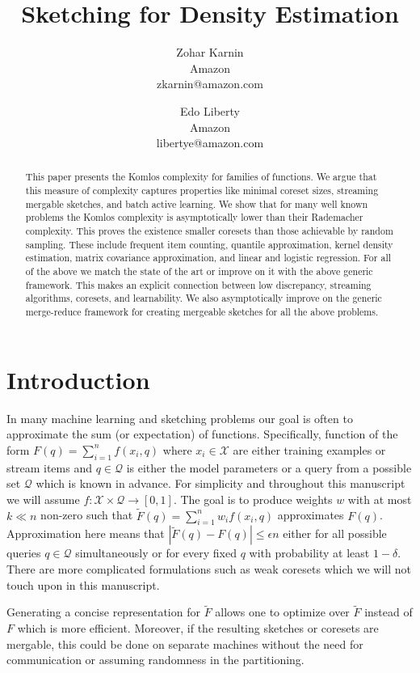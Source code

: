 \documentclass{article} %
\title{Sketching for Density Estimation}
\date{\nonumber}
\author{
Zohar Karnin\\Amazon\\zkarnin@amazon.com
\and
Edo Liberty\\Amazon\\libertye@amazon.com
}
\newcommand{\eps}{\epsilon}
\newcommand{\X}{\mathcal{X}}
\newcommand{\Q}{\mathcal{Q}}
\begin{document}
\maketitle

\begin{abstract}
This paper presents the Komlos complexity for families of functions.
We argue that this measure of complexity captures properties like minimal coreset sizes, streaming mergable sketches, and batch active learning.  
We show that for many well known problems the Komlos complexity is asymptotically lower than their Rademacher complexity.
This proves the existence smaller coresets than those achievable by random sampling. 
These include frequent item counting, quantile approximation, kernel density estimation, matrix covariance approximation, and linear and logistic regression.
For all of the above we match the state of the art or improve on it with the above generic framework.
This makes an explicit connection between low discrepancy, streaming algorithms, coresets, and learnability. 
We also asymptotically improve on the generic merge-reduce framework for creating mergeable sketches for all the above problems. 
\end{abstract}


\section{Introduction}

In many machine learning and sketching problems our goal is often to approximate the sum (or expectation) of functions.
Specifically, function of the form $F(q) = \sum_{i=1}^{n} f(x_i, q)$ where $x_i \in \mathcal X$ are either training examples or stream items and $q \in \mathcal Q$ is either the model parameters or a query from a possible set $\Q$ which is known in advance. For simplicity and throughout this manuscript we will assume $f:\X\times\Q\rightarrow [0,1]$.
The goal is to produce weights $w$ with at most $k \ll n$ non-zero such that $\tilde F(q) = \sum_{i=1}^{n}w_i f(x_i,q)$ approximates $F(q)$.
Approximation here means that $|\tilde F(q)  - F(q)| \le \eps n$ either for all possible queries $q \in \mathcal Q$ simultaneously or for every fixed $q$ with probability at least $1-\delta$. 
There are more complicated formulations such as weak coresets which we will not touch upon in this manuscript.

Generating a concise representation for $\tilde F$ allows one to optimize over $\tilde F$ instead of $F$ which is more efficient. 
Moreover, if the resulting sketches or coresets are mergable, this could be done on separate machines without the need for communication or assuming randomness in the partitioning.
\end{document}

